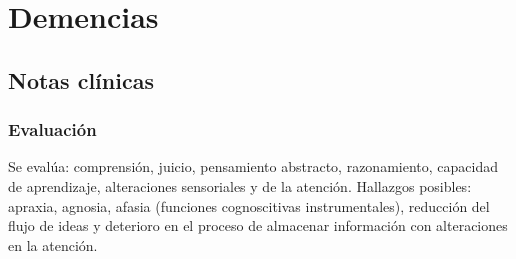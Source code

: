 \documentclass[encares.tex]{subfiles}
\begin{document}
\section*{Demencias}
\subsection*{Notas clínicas}
\subsubsection*{Evaluación}
Se evalúa: comprensión, juicio, pensamiento abstracto, razonamiento, capacidad de aprendizaje, alteraciones sensoriales y de la atención. Hallazgos posibles: apraxia, agnosia, afasia (funciones cognoscitivas instrumentales), reducción del flujo de ideas y deterioro en el proceso de almacenar información con alteraciones en la atención.
\end{document}

